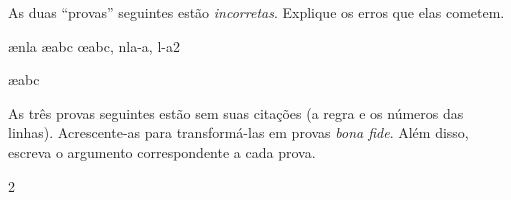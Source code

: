 \practiceproblems

\problempart
As duas \textquotedblleft{}provas\textquotedblright{} seguintes estão \emph{incorretas}. Explique os erros que elas cometem.
\begin{fitchproof}
\PR
\open
{}\AS
{}\ae{nla}
	\ae{abc}
\close
\open
	\AS
\close
{}\oe{abc, nla-a, l-a2}
\end{fitchproof}

\begin{fitchproof}
\PR
{}\PR
{}\ae{abc}
\end{fitchproof}

\problempart
As três provas seguintes estão sem suas citações (a regra e os números das linhas). Acrescente-as para transformá-las em provas \emph{bona fide}. Além disso, escreva o argumento correspondente a cada prova.
\begin{multicols}{2}
\begin{fitchproof}
\end{fitchproof}

\begin{fitchproof}
\open
\close
{}%
\end{fitchproof}

\begin{fitchproof}
\open
\close
\open
\close
{}%
\end{fitchproof}
\end{multicols}

